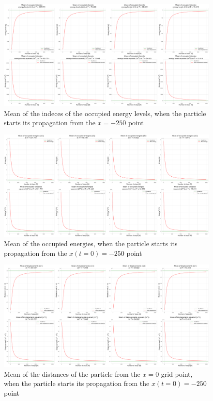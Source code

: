 \begin{figure}
    \centering
    \includegraphics[width=\textwidth]{images/discrete_levels_expected.pdf}
    \caption{Mean of the indeces of the occupied energy levels, when the particle starts its propagation from the $x = -250$ point}
    \label{fig:fig5}
\end{figure}

\begin{figure}
    \centering
    \includegraphics[width=\textwidth]{images/discrete_energies_expected.pdf}
    \caption{Mean of the occupied energies, when the particle starts its propagation from the $x \left( t = 0 \right) = -250$ point}
    \label{fig:fig6}
\end{figure}

\begin{figure}
    \centering
    \includegraphics[width=\textwidth]{images/discrete_displacements_expected.pdf}
    \caption{Mean of the distances of the particle from the $x = 0$ grid point, when the particle starts its propagation from the $x \left( t = 0 \right) = -250$ point}
    \label{fig:fig7}
\end{figure}

